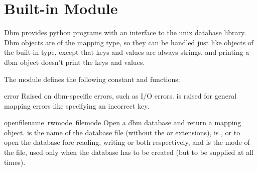 \section{Built-in Module }

Dbm provides python programs with an interface to the unix 
database library.  Dbm objects are of the mapping type, so they can be
handled just like objects of the built-in  type,
except that keys and values are always strings, and printing a dbm
object doesn't print the keys and values.

The module defines the following constant and functions:

\renewcommand{\indexsubitem}{(in module dbm)}
\begin{excdesc}{error}
Raised on dbm-specific errors, such as I/O errors.  is
raised for general mapping errors like specifying an incorrect key.
\end{excdesc}

\begin{funcdesc}{open}{filename\, rwmode\, filemode}
Open a dbm database and return a mapping object.   is
the name of the database file (without the  or 
extensions),  is ,  or  to
open the database fore reading, writing or both respectively,
and  is the \UNIX{} mode of the file, used only
when the database has to be created (but to be supplied at all times).
\end{funcdesc}
